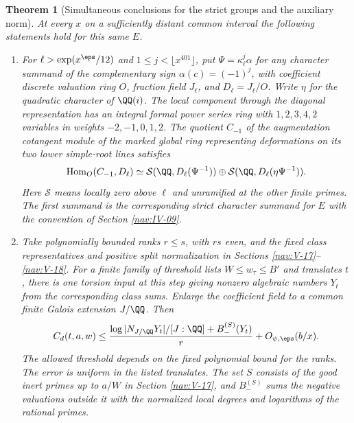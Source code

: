 \documentclass[a4paper,11pt]{article}
\newtheorem{theorem}[proposition]{Theorem}
\theoremstyle{definition}
\theoremstyle{remark}
\numberwithin{equation}{section}
\begin{document}
\begin{theorem}[Simultaneous conclusions for the strict groups and the auxiliary norm]\label{thm:joint75}
At every \(x\) on a sufficiently distant common interval the
following statements hold for this same \(E\).
\begin{enumerate}
\item For \(\ell>\exp(x^\eps/12)\) and
\(1\le j<\lfloor x^{401}\rfloor\), put
\(\Psi=\kappa_\ell^j\alpha\) for any character summand of the
complementary sign \(\alpha(c)=(-1)^j\), with coefficient
discrete valuation ring \(O\), fraction field \(J_\ell\), and
\(D_\ell=J_\ell/O\). Write \(\eta\) for the quadratic character
of \(\QQ(i)\). The local component through the diagonal
representation has an integral formal power series ring with
\(1,2,3,4,2\) variables in weights \(-2,-1,0,1,2\).
The quotient \(C_{-1}\) of the augmentation cotangent module
of the marked global ring representing deformations on its two
lower simple-root lines satisfies
\[
     \operatorname{Hom}_O(C_{-1},D_\ell)\simeq
      \mathcal S(\QQ,D_\ell(\Psi^{-1}))\oplus
      \mathcal S(\QQ,D_\ell(\eta\Psi^{-1})).
\]
Here \(\mathcal S\) means locally zero above \(\ell\) and
unramified at the other finite primes. The first summand
is the corresponding strict character summand for \(E\)
with the convention of Section \ref{nav:IV-09}.
\item Take polynomially bounded ranks \(r\le s\), with \(rs\)
even, and the fixed class representatives and positive split
normalization in
Sections \ref{nav:V-17}--\ref{nav:V-18}.
For a finite family of threshold lists \(W\le w_\tau\le B'\)
and translates \(t\), there is one torsion input at this step
giving nonzero algebraic numbers \(Y_t\) from the corresponding
class sums. Enlarge the coefficient field to a common finite
Galois extension \(J/\QQ\). Then
\begin{equation}
 C_d(t,a,w)\le
       \frac{\log|N_{J/\QQ}Y_t|/[J:\QQ]+B_-^{(S)}(Y_t)}r
              + O_{\psi,\eps}(b/x).                     \label{eq:joint75}
\end{equation}
The allowed threshold depends on the fixed polynomial bound for
the ranks. The error is uniform in the listed translates. The
set \(S\) consists of the good inert primes up to \(a/W\) in
Section \ref{nav:V-17}, and \(B_-^{(S)}\) sums the negative
valuations outside it with the normalized local degrees and
logarithms of the rational primes.
\end{enumerate}
\end{theorem}
\end{document}
